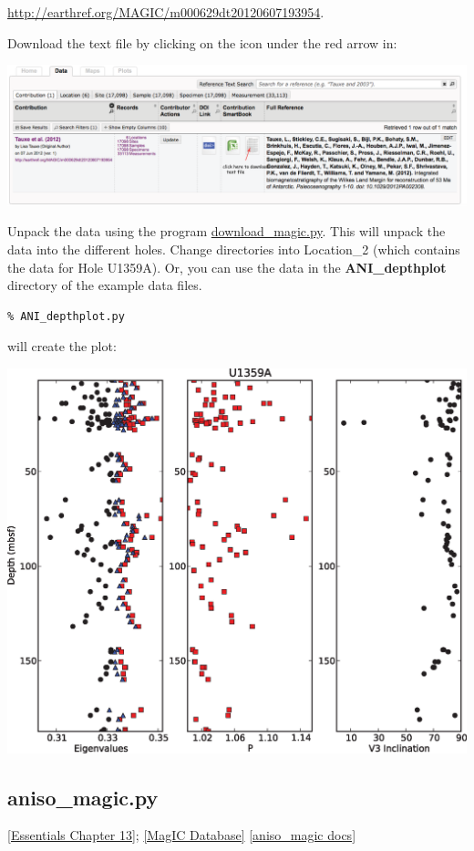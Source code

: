 \documentclass[11pt]{book}
\begin{document}
{\url{http://earthref.org/MAGIC/m000629dt20120607193954}.

Download the text file by clicking on the icon under the red arrow in:

  \includegraphics[width=15cm]{EPSfiles/tauxe12-magic.eps}

Unpack the data using the program \href{#download_magic.py}{download\_magic.py}.  This will unpack the data into the different holes.  Change directories into Location\_2 (which contains the data for Hole U1359A).  Or, you can use the data in the {\bf ANI\_depthplot} directory of the example data files.


\begin{verbatim}
% ANI_depthplot.py
\end{verbatim}

\noindent will create the plot:

\includegraphics[width=15cm]{EPSfiles/ani-depthplot.eps}


\subsection{aniso\_magic.py}
\href{http://earthref.org/MAGIC/books/Tauxe/Essentials/WebBook3ch13.html#ch13}{[Essentials Chapter 13]};
\href{#MagICDatabase}{[MagIC Database]}
\href{https://github.com/PmagPy/PmagPy/blob/master/programs/aniso_magic.py}{[aniso\_magic docs]}

}
\end{document}
